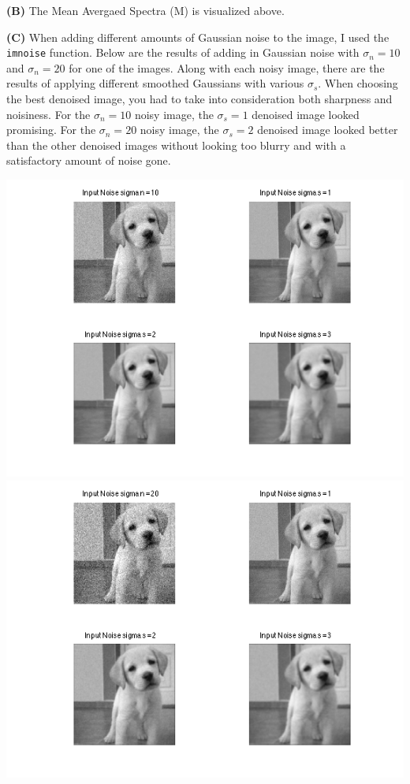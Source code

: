 \documentclass[12pt,twoside]{article}
\newcommand{\tabUnit}{3ex}
\newcommand{\tabT}{\hspace*{\tabUnit}}
\begin{document}
\textbf{(B)} The Mean Avergaed Spectra (M) is visualized above.
\newline

\textbf{(C)} When adding different amounts of Gaussian noise to the image, I used the \texttt{imnoise} function.  Below are the results of adding in Gaussian noise with $\sigma_n = 10$ and $\sigma_n = 20$ for one of the images.  Along with each noisy image, there are the results of applying different smoothed Gaussians with various $\sigma_s$.  When choosing the best denoised image, you had to take into consideration both sharpness and noisiness.  For the $\sigma_n = 10$ noisy image, the $\sigma_s = 1$ denoised image looked promising.  For the $\sigma_n = 20$ noisy image, the $\sigma_s = 2$ denoised image looked better than the other denoised images without looking too blurry and with a satisfactory amount of noise gone.   
\newline

    \includegraphics[scale=.7]{in_10} 
    \newline
    \tabT \includegraphics[scale=.7]{in_20} 
\end{document}
